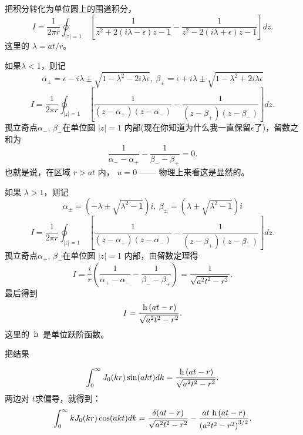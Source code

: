 \documentclass[CJK]{beamer}
\begin{document}
\begin{frame}
  把积分转化为单位圆上的围道积分，
  $$ I = \frac{1}{2\pi r}\oint_{|z|=1}\ \left[\frac{1}{z^2 +2(i\lambda-\epsilon)z - 1}-\frac{1}{z^2 -2(i\lambda+\epsilon)z - 1 } \right]dz.$$
  这里的 $\lambda = at/r$。
\end{frame}


\begin{frame}
  如果$\lambda< 1$，则记 $$\alpha_{\pm} = \epsilon-i\lambda \pm \sqrt{1-\lambda^2-2i\lambda \epsilon},\ \beta_{\pm} = \epsilon+i\lambda \pm \sqrt{1-\lambda^2 + 2i\lambda\epsilon}$$
  $$ I = \frac{1}{2\pi r}\oint_{|z|=1}\ \left[\frac{1}{(z-\alpha_+)(z-\alpha_-)}-\frac{1}{(z-\beta_+)(z-\beta_-)}\right]dz.$$
  孤立奇点$\alpha_-$, $\beta_-$在单位圆 $|z|=1$ 内部(现在你知道为什么我一直保留$\epsilon$了)，留数之和为
  $$\frac{1}{\alpha_--\alpha_+}-\frac{1}{\beta_--\beta_+} = 0. $$
  也就是说，在区域 $r> at$ 内， $u = 0$ —— 物理上来看这是显然的。
\end{frame}

\begin{frame}
  如果 $\lambda>1$，则记 $$\alpha_{\pm} = \left(-\lambda \pm \sqrt{\lambda^2-1}\right)i,\ \beta_{\pm} = \left(\lambda \pm \sqrt{\lambda^2-1}\right)i$$
  $$ I = \frac{1}{2\pi r}\oint_{|z|=1}\ \left[\frac{1}{(z-\alpha_+)(z-\alpha_-)}-\frac{1}{(z-\beta_+)(z-\beta_-)}\right]dz.$$
  孤立奇点$\alpha_+$, $\beta_-$在单位圆 $|z|=1$ 内部，由留数定理得
  $$ I = \frac{i}{r}\left(\frac{1}{\alpha_+-\alpha_-}-\frac{1}{\beta_--\beta_+}\right) = \frac{1}{\sqrt{a^2t^2-r^2}}. $$
  最后得到
  $$ I = \frac{\,\mathrm{h}\,(at-r)}{\sqrt{a^2t^2-r^2}}.$$
  这里的 $\,\mathrm{h}\,$ 是单位跃阶函数。
\end{frame}


\begin{frame}
  把结果
  
  $$ \int_0^\infty   J_0(kr)\sin(akt)  dk = \frac{\,\mathrm{h}\,(at-r)}{\sqrt{a^2t^2-r^2}}.$$  
  两边对 $t$求偏导，就得到：
  $$ \int_0^\infty  k J_0(kr)\cos(akt)  dk = \frac{\delta(at-r)}{\sqrt{a^2t^2-r^2}} - \frac{at\, \,\mathrm{h}\,(at-r)}{\left(a^2t^2-r^2\right)^{3/2}}.$$  
\end{frame}  

\ech
\end{document}
